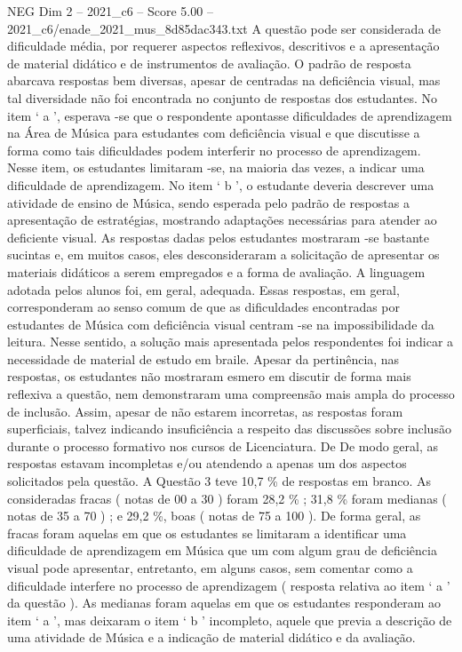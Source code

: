 \begin{textsample}{NEG Dim 2 – 2021\_c6 – Score 5.00 – 2021\_c6/enade\_2021\_mus\_8d85dac343.txt}
A questão pode ser considerada de dificuldade média, por requerer aspectos reflexivos, descritivos e a apresentação de material didático e de instrumentos de avaliação.
O padrão de resposta abarcava respostas bem diversas, apesar de centradas na deficiência visual, mas tal diversidade não foi encontrada no conjunto de respostas dos estudantes.
No item ‘ a ’, esperava -se que o respondente apontasse dificuldades de aprendizagem na Área de Música para estudantes com deficiência visual e que discutisse a forma como tais dificuldades podem interferir no processo de aprendizagem.
Nesse item, os estudantes limitaram -se, na maioria das vezes, a indicar uma dificuldade de aprendizagem.
No item ‘ b ’, o estudante deveria descrever uma atividade de ensino de Música, sendo esperada pelo padrão de respostas a apresentação de estratégias, mostrando adaptações necessárias para atender ao deficiente visual.
As respostas dadas pelos estudantes mostraram -se bastante sucintas e, em muitos casos, eles desconsideraram a solicitação de apresentar os materiais didáticos a serem empregados e a forma de avaliação.
A linguagem adotada pelos alunos foi, em geral, adequada.
Essas respostas, em geral, corresponderam ao senso comum de que as dificuldades encontradas por estudantes de Música com deficiência visual centram -se na impossibilidade da leitura.
Nesse sentido, a solução mais apresentada pelos respondentes foi indicar a necessidade de material de estudo em braile.
Apesar da pertinência, nas respostas, os estudantes não mostraram esmero em discutir de forma mais reflexiva a questão, nem demonstraram uma compreensão mais ampla do processo de inclusão.
Assim, apesar de não estarem incorretas, as respostas foram superficiais, talvez indicando insuficiência a respeito das discussões sobre inclusão durante o processo formativo nos cursos de Licenciatura.
De De modo geral, as respostas estavam incompletas e/ou atendendo a apenas um dos aspectos solicitados pela questão.
A Questão 3 teve 10,7 \% de respostas em branco.
As consideradas fracas ( notas de 00 a 30 ) foram 28,2 \% ; 31,8 \% foram medianas ( notas de 35 a 70 ) ; e 29,2 \%, boas ( notas de 75 a 100 ).
De forma geral, as fracas foram aquelas em que os estudantes se limitaram a identificar uma dificuldade de aprendizagem em Música que um com algum grau de deficiência visual pode apresentar, entretanto, em alguns casos, sem comentar como a dificuldade interfere no processo de aprendizagem ( resposta relativa ao item ‘ a ’ da questão ).
As medianas foram aquelas em que os estudantes responderam ao item ‘ a ’, mas deixaram o item ‘ b ’ incompleto, aquele que previa a descrição de uma atividade de Música e a indicação de material didático e da avaliação.

\end{textsample}
